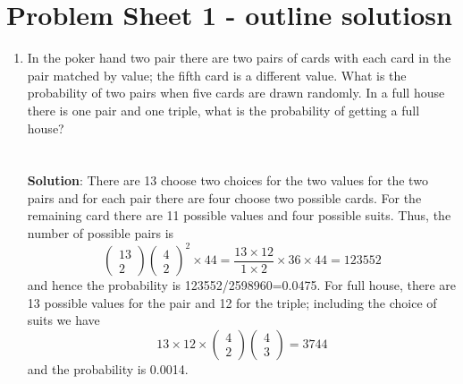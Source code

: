 \documentclass[11pt,a4paper]{scrartcl}
\begin{document}
\section*{Problem Sheet 1 - outline solutiosn}

\begin{enumerate}

\item In the poker hand two pair there are two pairs of cards with
  each card in the pair matched by value; the fifth card is a
  different value. What is the probability of two pairs when five
  cards are drawn randomly. In a full house there is one pair and one
  triple, what is the probability of getting a full
  house?\\ \\ \\ \textbf{Solution}: There are 13 choose two choices
  for the two values for the two pairs and for each pair there are
  four choose two possible cards. For the remaining card there are 11
  possible values and four possible suits. Thus, the number of
  possible pairs is
\begin{equation}
\left(\begin{array}{c}13\\2\end{array}\right)\left(\begin{array}{c}4\\2\end{array}\right)^2\times 44
=
\frac{13\times 12}{1\times 2}\times 36\times 44=123552
\end{equation}
and hence the probability is 123552/2598960=0.0475. For full house,
there are 13 possible values for the pair and 12 for the triple; including the choice of suits we have
\begin{equation}
13\times 12 \times \left(\begin{array}{c}4\\2\end{array}\right)\left(\begin{array}{c}4\\3\end{array}\right)=3744
\end{equation}
and the probability is 0.0014.


\end{enumerate}
\end{document}
